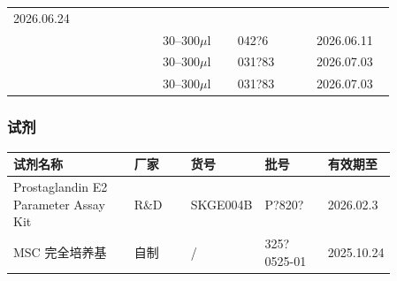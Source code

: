 \documentclass[UTF8,10pt,a4paper,fontset=fandol]{ctexart}
\newcommand{\fieldvalue}[1]{#1}
\newcommand{\handwritten}[1]{#1}
\begin{document}
\begin{tabular}{|p{0.18\linewidth}|p{0.18\linewidth}|p{0.18\linewidth}|p{0.19\linewidth}|p{0.19\linewidth}|}
\fieldvalue{\handwritten{2026.06.24}} \\
\cline{3-5}
& &
\fieldvalue{\handwritten{30--300$\mu$l}} &
\fieldvalue{\handwritten{042?6}} &
\fieldvalue{\handwritten{2026.06.11}} \\
\cline{3-5}
& &
\fieldvalue{\handwritten{30--300$\mu$l}} &
\fieldvalue{\handwritten{031?83}} &
\fieldvalue{\handwritten{2026.07.03}} \\
\cline{3-5}
& &
\fieldvalue{\handwritten{30--300$\mu$l}} &
\fieldvalue{\handwritten{031?83}} &
\fieldvalue{\handwritten{2026.07.03}} \\
\hline
\end{tabular}

\subsubsection{试剂}

\begin{tabular}{|p{0.34\linewidth}|p{0.16\linewidth}|p{0.18\linewidth}|p{0.18\linewidth}|}
\hline
试剂名称 & 厂家 & 货号 & 批号 & 有效期至 \\
\hline
Prostaglandin E2 Parameter Assay Kit & R\&D & SKGE004B &
\fieldvalue{\handwritten{P?820?}} &
\fieldvalue{\handwritten{2026.02.3}} \\
\hline
MSC 完全培养基 & 自制 & / &
\fieldvalue{\handwritten{325?0525-01}} &
\fieldvalue{\handwritten{2025.10.24}} \\
\hline
\end{tabular}
\end{document}
